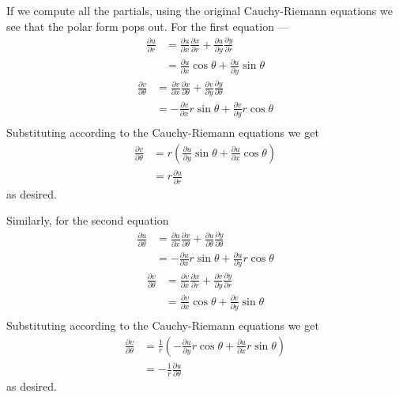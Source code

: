 \documentclass[12 pt, letterpaper]{hmcpset}
\begin{document}
\begin{solution}
	If we compute all the partials, using the original Cauchy-Riemann equations we see that the polar form pops out. For the first equation ---
	\[
		\begin{split}
			\frac{\partial u}{\partial r} & = \frac{\partial u}{\partial x} \frac{\partial x}{\partial r} + \frac{\partial u}{\partial y} \frac{\partial y}{\partial r} \\
						      & = \frac{\partial u}{\partial x} \cos{\theta} + \frac{\partial u}{\partial y} \sin{\theta}
		\end{split}
	\]
	\[
		\begin{split}
			\frac{\partial v}{\partial \theta} & = \frac{\partial v}{\partial x} \frac{\partial x}{\partial \theta} + \frac{\partial v}{\partial y} \frac{\partial y}{\partial \theta} \\
							   & = - \frac{\partial v}{\partial x} r \sin{\theta} + \frac{\partial v}{\partial y} r \cos{\theta} \\
		\end{split}
	\]
	Substituting according to the Cauchy-Riemann equations we get
	\[
		\begin{split}
			\frac{\partial v}{\partial \theta} & = r \left ( \frac{\partial u}{\partial y} \sin{\theta} + \frac{\partial u}{\partial x} \cos{\theta} \right ) \\
							   & = r \frac{\partial u}{\partial r}
		\end{split}
	\]
	as desired.

	Similarly, for the second equation
	\[
		\begin{split}
			\frac{\partial u}{\partial \theta} & = \frac{\partial u}{\partial x} \frac{\partial x}{\partial \theta} + \frac{\partial u}{\partial \theta} \frac{\partial y}{\partial \theta} \\
						      & = - \frac{\partial u}{\partial x} r \sin{\theta} + \frac{\partial u}{\partial y} r \cos{\theta}
		\end{split}
	\]
	\[
		\begin{split}
			\frac{\partial v}{\partial \theta} & = \frac{\partial v}{\partial x} \frac{\partial x}{\partial r} + \frac{\partial v}{\partial y} \frac{\partial y}{\partial r} \\
							   & = \frac{\partial v}{\partial x} \cos{\theta} + \frac{\partial v}{\partial y} \sin{\theta} \\
		\end{split}
	\]
	Substituting according to the Cauchy-Riemann equations we get
	\[
		\begin{split}
			\frac{\partial v}{\partial \theta} & = \frac{1}{r} \left (- \frac{\partial u}{\partial y} r \cos{\theta} + \frac{\partial u}{\partial x} r \sin{\theta} \right ) \\
							   & = - \frac{1}{r} \frac{\partial u}{\partial \theta}
		\end{split}
	\]
	as desired.


\end{solution}
\end{document}
